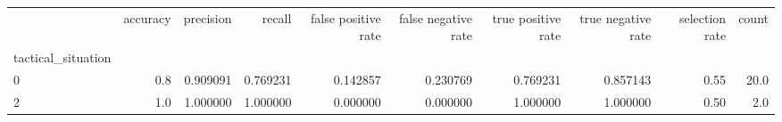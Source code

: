\begin{tabular}{lrrrrrrrrr}
\toprule
{} &  accuracy &  precision &    recall &  false positive rate &  false negative rate &  true positive rate &  true negative rate &  selection rate &  count \\
tactical\_situation &           &            &           &                      &                      &                     &                     &                 &        \\
\midrule
0                  &       0.8 &   0.909091 &  0.769231 &             0.142857 &             0.230769 &            0.769231 &            0.857143 &            0.55 &   20.0 \\
2                  &       1.0 &   1.000000 &  1.000000 &             0.000000 &             0.000000 &            1.000000 &            1.000000 &            0.50 &    2.0 \\
\bottomrule
\end{tabular}
